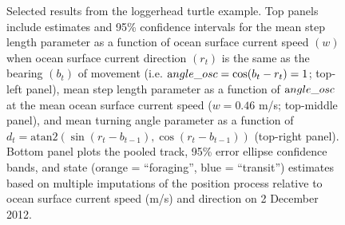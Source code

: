 \documentclass[12pt]{article}\usepackage[]{graphicx}\usepackage[]{color}
\begin{document}
\begin{figure}[htbp]
  \caption{Selected results from the loggerhead turtle example. Top panels include estimates and 95\% confidence intervals for the mean step length parameter as a function of ocean surface current speed $(w)$ when ocean surface current direction $(r_t)$ is the same as the bearing $(b_t)$ of movement (i.e. ${\text angle\_osc}=\cos(b_t-r_t)=1$; top-left panel), mean step length parameter as a function of ${\text angle\_osc}$ at the mean ocean surface current speed ($w=0.46$ m/s; top-middle panel), and mean turning angle parameter as a function of $d_t=\text{atan2}(\sin(r_t-b_{t-1}),\cos(r_t-b_{t-1}))$ (top-right panel). Bottom panel plots the pooled track, 95\% error ellipse confidence bands, and state (orange = ``foraging'', blue = ``transit'') estimates based on multiple imputations of the position process relative to ocean surface current speed (m/s) and direction on 2 December 2012.}
  \label{fig:turtleResults}
\end{figure}
\end{document}
